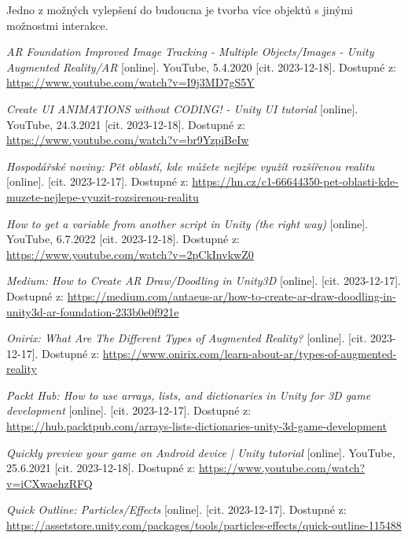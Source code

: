 \documentclass[12pt, a4paper,
twoside,        %
openright
]{report}
\begin{document}
 Jedno z možných vylepšení do budoucna je tvorba více objektů s jinými možnostmi interakce.




\renewcommand\bibname{Seznam použitých informačních zdrojů}
\begin{thebibliography}{99}
 \textit{AR Foundation Improved Image Tracking - Multiple Objects/Images - Unity Augmented Reality/AR} [online]. YouTube, 5.4.2020 [cit. 2023-12-18]. Dostupné z: \url{https://www.youtube.com/watch?v=I9j3MD7gS5Y}

 \textit{Create UI ANIMATIONS without CODING! - Unity UI tutorial} [online]. YouTube, 24.3.2021 [cit. 2023-12-18]. Dostupné z: \url{https://www.youtube.com/watch?v=br9YzpiBeIw}	

\textit{Hospodářské noviny: Pět oblastí, kde můžete nejlépe využít rozšířenou realitu} [online]. [cit. 2023-12-17]. Dostupné z: \url{https://hn.cz/c1-66644350-pet-oblasti-kde-muzete-nejlepe-vyuzit-rozsirenou-realitu}

 \textit{How to get a variable from another script in Unity (the right way)} [online]. YouTube, 6.7.2022 [cit. 2023-12-18]. Dostupné z: \url{https://www.youtube.com/watch?v=2pCkInvkwZ0}

\textit{Medium: 
How to Create AR Draw/Doodling in Unity3D} [online]. [cit. 2023-12-17]. Dostupné z: \url{https://medium.com/antaeus-ar/how-to-create-ar-draw-doodling-in-unity3d-ar-foundation-233b0e0f921e}

\textit{Onirix: What Are The Different Types of Augmented Reality?} [online]. [cit. 2023-12-17]. Dostupné z: \url{https://www.onirix.com/learn-about-ar/types-of-augmented-reality}

\textit{Packt Hub: How to use arrays, lists, and dictionaries in Unity for 3D game development} [online]. [cit. 2023-12-17]. Dostupné z: \url{https://hub.packtpub.com/arrays-lists-dictionaries-unity-3d-game-development}

 \textit{Quickly preview your game on Android device | Unity tutorial} [online]. YouTube, 25.6.2021 [cit. 2023-12-18]. Dostupné z: \url{https://www.youtube.com/watch?v=iCXwaehzRFQ}

\textit{Quick Outline: Particles/Effects} [online]. [cit. 2023-12-17]. Dostupné z: \url{https://assetstore.unity.com/packages/tools/particles-effects/quick-outline-115488}


\end{thebibliography}
\end{document}
